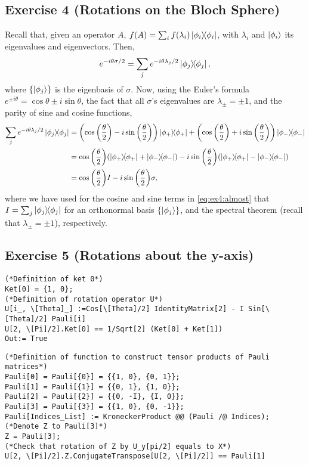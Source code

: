 \subsection{Exercise 4 (Rotations on the Bloch Sphere)}\noindent
Recall that, given an operator $A$, $f(A)=\sum_if(\lambda_i)\dyad{\phi_i}{\phi_i}$,
with $\lambda_i$ and $\ket{\phi_i}$ its eigenvalues and eigenvectors. Then, 
\begin{align}
e^{-i\theta\sigma/2}=\sum_{j}e^{-i\theta\lambda_j/2}\dyad{\phi_j}{\phi_j},
\end{align}
where $\qty{\ket{\phi_j}}$ is the eigenbasis of $\sigma$. Now, using the 
Euler's formula $e^{\pm i\theta}=\cos \theta\pm i\sin\theta$, the fact that 
all $\sigma$'s eigenvalues are $\lambda_{\pm}=\pm 1$, and the parity 
of sine and cosine functions,
\begin{subequations}
\begin{align}
\sum_{j}e^{-i\theta\lambda_j/2}\dyad{\phi_j}{\phi_j}&=
\qty(\cos\qty(\frac{\theta}{2})-i\sin\qty(\frac{\theta}{2}))\dyad{\phi_+}{\phi_+}
+\qty(\cos\qty(\frac{\theta}{2})+i\sin\qty(\frac{\theta}{2}))\dyad{\phi_-}{\phi_-}\\
&=\cos\qty(\frac{\theta}{2})\qty(\dyad{\phi_+}{\phi_+}+\dyad{\phi_-}{\phi_-})
-i\sin\qty(\frac{\theta}{2})\qty(\dyad{\phi_+}{\phi_+}-\dyad{\phi_-}{\phi_-})\label{eq:ex4:almost}\\
&=\cos\qty(\frac{\theta}{2})I-i\sin\qty(\frac{\theta}{2})\sigma,
\end{align}
\end{subequations}
where we have used for the cosine and sine terms in \eqref{eq:ex4:almost}
that $I=\sum_j\dyad{\phi_j}{\phi_j}$ for an orthonormal
basis $\qty{\ket{\phi_j}}$, and the spectral theorem (recall that 
$\lambda_{\pm}=\pm1$), respectively.

\subsection{Exercise 5 (Rotations about the y-axis)}
\begin{verbatim}
(*Definition of ket 0*)
Ket[0] = {1, 0};
(*Definition of rotation operator U*)
U[i_, \[Theta]_] :=Cos[\[Theta]/2] IdentityMatrix[2] - I Sin[\[Theta]/2] Pauli[i]
U[2, \[Pi]/2].Ket[0] == 1/Sqrt[2] (Ket[0] + Ket[1])
Out:= True
\end{verbatim}

\begin{verbatim}
(*Definition of function to construct tensor products of Pauli matrices*)
Pauli[0] = Pauli[{0}] = {{1, 0}, {0, 1}};
Pauli[1] = Pauli[{1}] = {{0, 1}, {1, 0}};
Pauli[2] = Pauli[{2}] = {{0, -I}, {I, 0}};
Pauli[3] = Pauli[{3}] = {{1, 0}, {0, -1}};
Pauli[Indices_List] := KroneckerProduct @@ (Pauli /@ Indices);
(*Denote Z to Pauli[3]*)
Z = Pauli[3];
(*Check that rotation of Z by U_y[pi/2] equals to X*)
U[2, \[Pi]/2].Z.ConjugateTranspose[U[2, \[Pi]/2]] == Pauli[1]
\end{verbatim}

